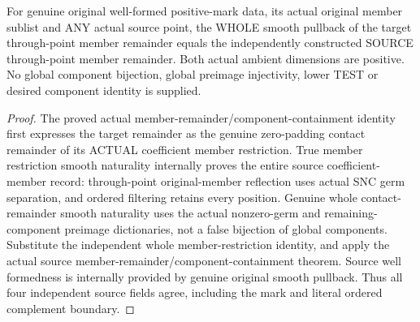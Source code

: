 \begin{theorem}
\label{hir:original-member-remainder-whole-smooth-initial-dictionary}
\leanok
For genuine original well-formed positive-mark data, its actual original
member sublist and ANY actual source point, the WHOLE smooth pullback of
the target through-point member remainder equals the independently
constructed SOURCE through-point member remainder. Both actual ambient
dimensions are positive. No global component bijection, global preimage
injectivity, lower TEST or desired component identity is supplied.
\end{theorem}
\begin{proof}
The proved actual member-remainder/component-containment identity first
expresses the target remainder as the genuine zero-padding contact
remainder of its ACTUAL coefficient member restriction. True member
restriction smooth naturality internally proves the entire source
coefficient-member record: through-point original-member reflection
uses actual SNC germ separation, and ordered filtering retains every
position. Genuine whole contact-remainder smooth naturality uses the
actual nonzero-germ and remaining-component preimage dictionaries,
not a false bijection of global components. Substitute the independent
whole member-restriction identity, and apply the actual source
member-remainder/component-containment theorem. Source well formedness
is internally provided by genuine original smooth pullback. Thus all
four independent source fields agree, including the mark and literal
ordered complement boundary.
\end{proof}

